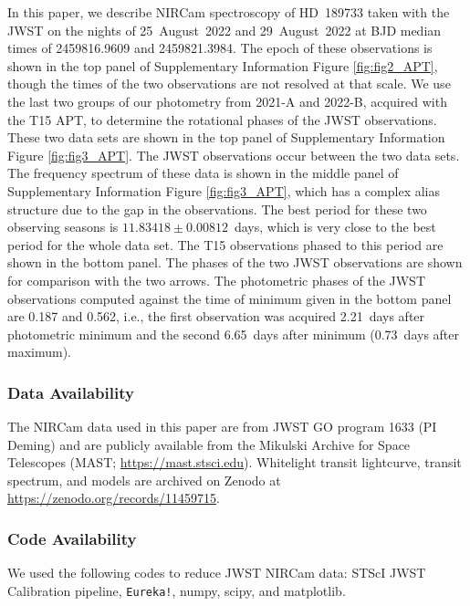 \documentclass[sn-standardnature]{sn-jnl}%
\begin{document}
In this paper, we describe NIRCam spectroscopy of HD~189733 taken with the JWST on the nights of 25~August~2022 and 29~August~2022 at BJD median times of 2459816.9609 and 2459821.3984.  The epoch of these observations is shown in the top panel of Supplementary Information Figure \ref{fig:fig2_APT}, though the times of the two observations are not resolved at that scale.  We use the last two groups of our photometry from 2021-A and 2022-B, acquired with the T15 APT, to determine the rotational phases of the JWST observations.  These two data sets are shown in the top panel of Supplementary Information Figure \ref{fig:fig3_APT}.  The JWST observations occur between the two data sets.  The frequency spectrum of these data is shown in the middle panel of Supplementary Information Figure \ref{fig:fig3_APT}, which has a complex alias structure due to the gap in the observations. The best period for these two observing 
seasons is $11.83418\pm0.00812$~days, which is very close to the best period for the whole data set. The T15 observations phased to this period are shown in the bottom panel.  The phases of the two JWST observations are shown for comparison with the two arrows.  The photometric phases of the JWST observations computed against the time of minimum given in the bottom panel are 0.187 and 0.562, i.e., the first observation was acquired 2.21~days after photometric minimum and the second 6.65~days after minimum (0.73~days after maximum).






\subsubsection*{Data Availability}
The NIRCam data used in this paper are from JWST GO program 1633 (PI Deming) and are publicly available from the Mikulski Archive for Space Telescopes (MAST; \url{https://mast.stsci.edu}). Whitelight transit lightcurve, transit spectrum, and models are archived on Zenodo at \url{https://zenodo.org/records/11459715}.\\


\subsubsection*{Code Availability}
We used the following codes to reduce JWST NIRCam data: STScI JWST Calibration pipeline, \texttt{Eureka!}, numpy, scipy, and matplotlib.\\
\end{document}
